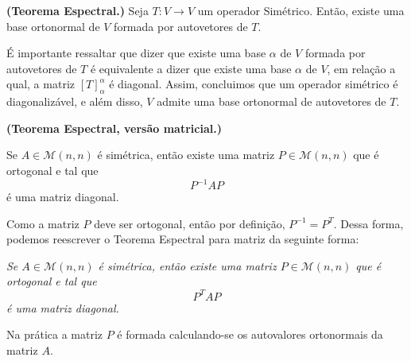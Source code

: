 \vspace{0.7cm}


\begin{thm} {\textbf{(Teorema Espectral.)}}
Seja $T:  V \rightarrow V$ um operador Simétrico. Então, existe uma base ortonormal  de $V$ formada por autovetores de $T$.
\end{thm}


É importante ressaltar que dizer que existe uma base $\alpha$ de $V$ formada por autovetores de $T$ é equivalente a dizer que existe uma base $\alpha$  de $V$, em relação a qual, a matriz $[T]_{\alpha}^{\alpha}$ é diagonal. Assim, concluimos que um operador simétrico é diagonalizável, e além disso,  $V$ admite uma base ortonormal  de  autovetores de $T$.
\vspace{0.7cm}
\begin{thm}{\textbf{(Teorema Espectral, versão matricial.)}}

Se  $A \in \mathcal{M}(n,n)$   é  simétrica,  então existe uma matriz  $P \in \mathcal{M}(n,n)$ que é  ortogonal e tal que $$P^{-1}AP$$ é uma matriz diagonal.
\end{thm}


Como a matriz $P$ deve ser  ortogonal, então por definição,  $P^{-1}=P^T$.  Dessa forma, podemos reescrever o Teorema Espectral para matriz da seguinte forma:

 \vspace{0.3cm}
\textit{Se  $A \in \mathcal{M}(n,n)$   é  simétrica,  então existe uma matriz  $P \in \mathcal{M}(n,n)$ que é  ortogonal e tal que $$P^{T}AP$$ é uma matriz diagonal.}

Na prática a matriz $P$ é formada calculando-se os autovalores ortonormais da matriz $A$.
